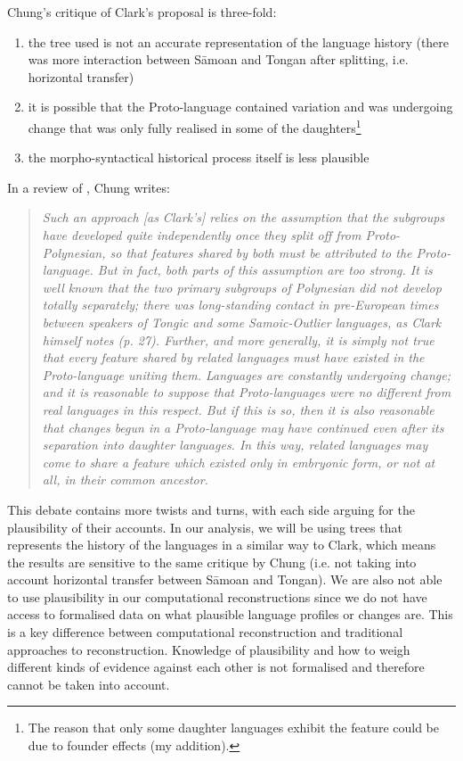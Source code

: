 \documentclass[a4paper,10pt]{article} %
\begin{document}
Chung's critique of Clark's proposal is three-fold: 
\begin{enumerate}[label=(\alph*)]
\item the tree used is not an accurate representation of the language history (there was more interaction between S\={a}moan and Tongan after splitting, i.e. horizontal transfer)
\item it is possible that the Proto-language contained variation and was undergoing change that was only fully realised in some of the daughters\footnote{The reason that only some daughter languages exhibit the feature could be due to founder effects (my addition).} 
\item the morpho-syntactical historical process itself is less plausible
\end{enumerate}

In a review of \citet{clark1976aspects}, Chung writes:

\begin{quotation}
\noindent\emph{Such an approach [as Clark's] relies on the assumption that the subgroups have developed quite independently once they split off from Proto-Polynesian, so that features shared by both must be attributed to the Proto-language. But in fact, both parts of this assumption are too strong. It is well known that the two primary subgroups of Polynesian did not develop totally separately; there was long-standing contact in pre-European times between speakers of Tongic and some Samoic-Outlier languages, as Clark himself notes (p. 27). Further, and more generally, it is simply not true that every feature shared by related languages must have existed in the Proto-language uniting them. Languages are constantly undergoing change; and it is reasonable to suppose that Proto-languages were no different from real languages in this respect. But if this is so, then it is also reasonable that changes begun in a Proto-language may have continued even after its separation into daughter languages. In this way, related languages may come to share a feature which existed only in embryonic form, or not at all, in their common ancestor.}
\end{quotation}
\begin{flushright} \citet[539]{chung1977aspects}  \end{flushright}

This debate contains more twists and turns, with each side arguing for the plausibility of their accounts. In our analysis, we will be using trees that represents the history of the languages in a similar way to Clark, which means the results are sensitive to the same critique by Chung (i.e. not taking into account horizontal transfer between S\={a}moan and Tongan). We are also not able to use plausibility in our computational reconstructions since we do not have access to formalised data on what plausible language profiles or changes are. This is a key difference between computational reconstruction and traditional approaches to reconstruction. Knowledge of plausibility and how to weigh different kinds of evidence against each other is not formalised and therefore cannot be taken into account.
\end{document}
